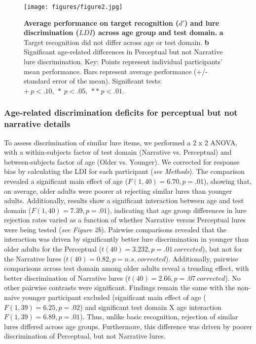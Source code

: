 \documentclass[11pt]{article}
\begin{document}
\begin{figure}
\centering
\texttt{[image: figures/figure2.jpg]}
\caption{\small \textbf{Average performance on target recognition ($d'$) and lure discrimination ($LDI$) across age group and test domain.} \textbf{a} Target recognition did not differ across age or test domain. \textbf{b} Significant age-related differences in Perceptual but not Narrative lure discrimination. Key: Points represent individual participants' mean performance. Bars represent average performance (+/- standard error of the mean). Significant tests: $+ \ p < .10, \ * \ p < .05, \ ** \ p < .01$.}
\label{fig:schematic}
\end{figure}

\subsubsection*{Age-related discrimination deficits for perceptual but not narrative details}
To assess discrimination of similar lure items, we performed a 2 x 2 ANOVA, with a within-subjects factor of test domain (Narrative vs. Perceptual) and between-subjects factor of age (Older vs. Younger). We corrected for response bias by calculating the LDI for each participant (\textit{see Methods}). The comparison revealed a significant main effect of age ($F(1, 40) = 6.70, p = .01$), showing that, on average, older adults were poorer at rejecting similar lures than younger adults. Additionally, results show a significant interaction between age and test domain ($F(1, 40) = 7.39, p = .01$), indicating that age group differences in lure rejection rates varied as a function of whether Narrative versus Perceptual lures were being tested (\textit{see Figure 2b}). Pairwise comparisons revealed that the interaction was driven by significantly better lure discrimination in younger than older adults for the Perceptual ($t(40) = 3.232, p = .01 \ corrected$), but not for the Narrative lures ($t(40) = 0.82, p = n.s. \ corrected$). Additionally, pairwise comparisons across test domain among older adults reveal a trending effect, with better discrimination of Narrative lures ($t(40) = 2.66, p = .07 \ corrected$). No other pairwise contrasts were significant. Findings remain the same with the non-naive younger participant excluded (significant main effect of age ($F(1, 39) = 6.25, p = .02$) and significant test domain X age interaction $F(1, 39) = 6.89, p = .01$). Thus, unlike basic recognition, rejection of similar lures differed across age groups. Furthermore, this difference was driven by poorer discrimination of Perceptual, but not Narrative lures.
\end{document}
